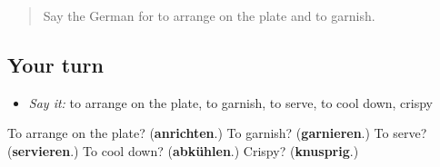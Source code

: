 \begin{quote}
Say the German for to arrange on the plate and to garnish.
\end{quote}

\subsection*{Your turn}
\begin{itemize}
\raggedright
  \item \emph{Say it:} to arrange on the plate, to garnish, to serve, to cool down, crispy
\end{itemize}

\begin{tcolorbox}[breakable,colback=teal!4,colframe=teal!35!black,title={Before you move on}]
To arrange on the plate? (\textbf{anrichten}.) To garnish? (\textbf{garnieren}.) To serve? (\textbf{servieren}.) To cool down? (\textbf{abkühlen}.) Crispy? (\textbf{knusprig}.)
\end{tcolorbox}
